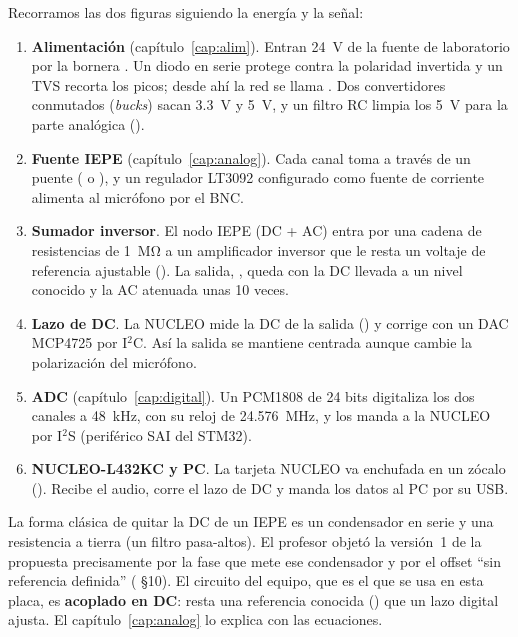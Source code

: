 Recorramos las dos figuras siguiendo la energía y la señal:

\begin{enumerate}
  \item \textbf{Alimentación} (capítulo~\ref{cap:alim}). Entran \SI{24}{\volt} de la fuente de laboratorio por la bornera . Un diodo en serie protege contra la polaridad invertida y un TVS recorta los picos; desde ahí la red se llama . Dos convertidores conmutados (\emph{bucks}) sacan \SI{3.3}{\volt} y \SI{5}{\volt}, y un filtro RC limpia los \SI{5}{\volt} para la parte analógica ().
  \item \textbf{Fuente IEPE} (capítulo~\ref{cap:analog}). Cada canal toma  a través de un puente ( o ), y un regulador LT3092 configurado como fuente de corriente alimenta al micrófono por el BNC.
  \item \textbf{Sumador inversor}. El nodo IEPE (DC + AC) entra por una cadena de resistencias de \SI{1}{\mega\ohm} a un amplificador inversor que le resta un voltaje de referencia ajustable (). La salida, , queda con la DC llevada a un nivel conocido y la AC atenuada unas 10 veces.
  \item \textbf{Lazo de DC}. La NUCLEO mide la DC de la salida () y corrige  con un DAC MCP4725 por I$^2$C. Así la salida se mantiene centrada aunque cambie la polarización del micrófono.
  \item \textbf{ADC} (capítulo~\ref{cap:digital}). Un PCM1808 de 24 bits digitaliza los dos canales a \SI{48}{\kilo\hertz}, con su reloj de \SI{24.576}{\mega\hertz}, y los manda a la NUCLEO por I$^2$S (periférico SAI del STM32).
  \item \textbf{NUCLEO-L432KC y PC}. La tarjeta NUCLEO va enchufada en un zócalo (). Recibe el audio, corre el lazo de DC y manda los datos al PC por su USB.
\end{enumerate}

\begin{idea}
La forma clásica de quitar la DC de un IEPE es un condensador en serie y una resistencia a tierra (un filtro pasa-altos). El profesor objetó la versión~1 de la propuesta precisamente por la fase que mete ese condensador y por el offset ``sin referencia definida'' ( §10). El circuito del equipo, que es el que se usa en esta placa, es \textbf{acoplado en DC}: resta una referencia conocida () que un lazo digital ajusta. El capítulo~\ref{cap:analog} lo explica con las ecuaciones.
\end{idea}

